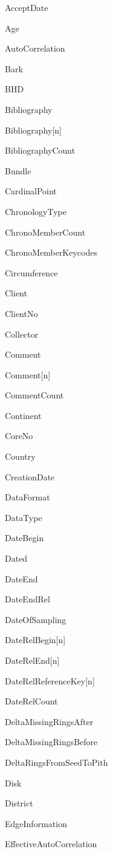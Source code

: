 \begin{multicols}{2}
\begin{itemize*}
 \item  AcceptDate
 \item  Age
 \item  AutoCorrelation
 \item  Bark
 \item  BHD
 \item  Bibliography
 \item  Bibliography[n]
 \item  BibliographyCount
 \item  Bundle
 \item  CardinalPoint
 \item  ChronologyType
 \item  ChronoMemberCount
 \item  ChronoMemberKeycodes
 \item  Circumference
 \item  Client
 \item  ClientNo
 \item  Collector
 \item  Comment
 \item  Comment[n]
 \item  CommentCount
 \item  Continent
 \item  CoreNo
 \item  Country
 \item  CreationDate
 \item  DataFormat
 \item  DataType
 \item  DateBegin
 \item  Dated
 \item  DateEnd
 \item  DateEndRel
 \item  DateOfSampling
 \item  DateRelBegin[n]
 \item  DateRelEnd[n]
 \item  DateRelReferenceKey[n]
 \item  DateRelCount
 \item  DeltaMissingRingsAfter
 \item  DeltaMissingRingsBefore
 \item  DeltaRingsFromSeedToPith
 \item  Disk
 \item  District
 \item  EdgeInformation
 \item  EffectiveAutoCorrelation

\end{itemize*}
\end{multicols}
